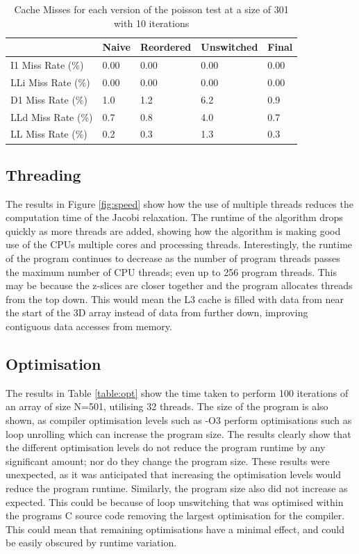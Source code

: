 \documentclass[12pt]{article}
\begin{document}
\begin{table}[H]
    \centering
    \caption{Cache Misses for each version of the poisson test at a size of 301 with 10 iterations}
    \label{table:cache}
    \begin{tabular}{ | m{4cm} | m{2cm} | m{2cm} | m{2cm} | m{2cm} | }
        \hline
        & Naive & Reordered & Unswitched & Final\\
        \hline
        I1 Miss Rate (\%) & 0.00 & 0.00 & 0.00 & 0.00\\
        \hline
        LLi Miss Rate (\%) & 0.00 & 0.00 & 0.00 & 0.00\\
        \hline
        D1 Miss Rate (\%) & 1.0 & 1.2 & 6.2 & 0.9\\
        \hline
        LLd Miss Rate (\%) & 0.7 & 0.8 & 4.0 & 0.7\\
        \hline
        LL Miss Rate (\%) & 0.2 & 0.3 & 1.3 & 0.3\\
        \hline
        
    \end{tabular}
\end{table}

\subsection{Threading}
The results in Figure \ref{fig:speed} show how the use of multiple threads reduces the computation time of the Jacobi relaxation.
The runtime of the algorithm drops quickly as more threads are added, showing how the algorithm is making good use
of the CPUs multiple cores and processing threads. Interestingly, the runtime of the program continues to decrease
as the number of program threads passes the maximum number of CPU threads; even up to 256 program threads. This may
be because the z-slices are closer together and the program allocates threads from the top down. This would mean
the L3 cache is filled with data from near the start of the 3D array instead of data from further down,
improving contiguous data accesses from memory.

\subsection{Optimisation}
The results in Table \ref{table:opt} show the time taken to perform 100 iterations of an array of size N=501,
utilising 32 threads. The size of the program is also shown, as compiler optimisation levels such as -O3 perform
optimisations such as loop unrolling which can increase the program size. The results clearly show that the
different optimisation levels do not reduce the program runtime by any significant amount; nor do they change
the program size. These results were unexpected, as it was anticipated that increasing the optimisation levels
would reduce the program runtime. Similarly, the program size also did not increase as expected. This could be
because of loop unswitching that was optimised within the programs C source code removing the largest optimisation
for the compiler. This could mean that remaining optimisations have a minimal effect, and could be easily
obscured by runtime variation. 
\end{document}
